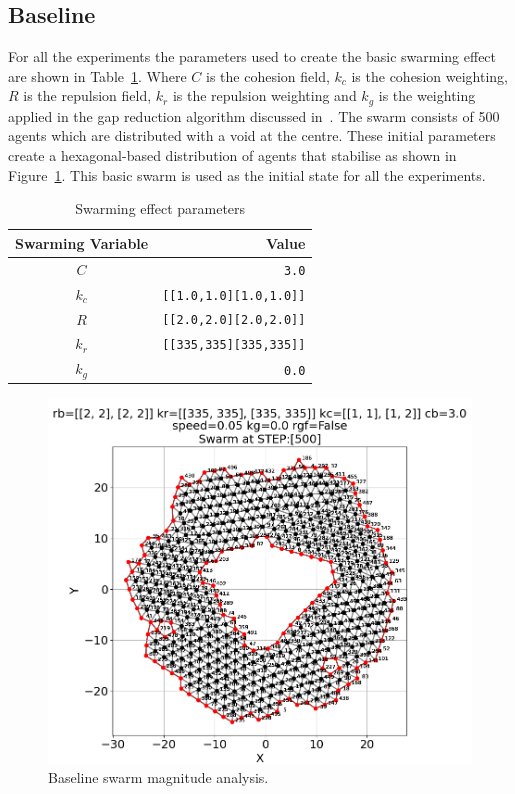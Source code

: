 \documentclass[12pt,a4paper]{IEEEtran}
\newcommand{\kc}{\mathit{k_c}}
\newcommand{\kr}{\mathit{k_r}}
\newcommand{\kg}{\mathit{k_g}}
\newcommand{\rb}{\mathit{R}}
\begin{document}
\subsection{Baseline}
For all the experiments the parameters used to create the basic swarming effect are shown in Table~\ref{tab:swarmingEffect}. Where $C$ is the cohesion field, $\kc$ is the cohesion weighting, $\rb$ is the repulsion field, $\kr$ is the repulsion weighting and $\kg$ is the weighting applied in the gap reduction algorithm discussed in~\cite{eliot2019void}. The swarm consists of 500 agents which are distributed with a void at the centre. These initial parameters create a hexagonal-based distribution of agents that stabilise as shown in Figure~\ref{fig:baselineSwarm}. This basic swarm is used as the initial state for all the experiments. 
 \begin{table}[H]
	\centering
	\tiny
	\begin{tabular}{|c|r|}
		\hline
		\rowcolor[HTML]{000000} 
		{\color[HTML]{FFFFFF} Swarming Variable} & {\color[HTML]{FFFFFF} Value} \\ \hline
		$C$ & \texttt{3.0} \\ \hline
		$k_c$ & \texttt{[[1.0,1.0][1.0,1.0]]}  \\ \hline
		$R$ & \texttt{[[2.0,2.0][2.0,2.0]]} \\ \hline
		$k_r$ & \texttt{[[335,335][335,335]]} \\ \hline
		$k_g$ & \texttt{0.0} \\ \hline
	\end{tabular}
  	\caption{Swarming effect parameters}
  	\label{tab:swarmingEffect}
\end{table}

\begin{figure}[H]
	\begin{center}
		\includegraphics[width=1.0\linewidth]{figures/baseline}
	\end{center}
	\caption{Baseline swarm magnitude analysis. \label{fig:baselineSwarm}}
\end{figure}
\end{document}
